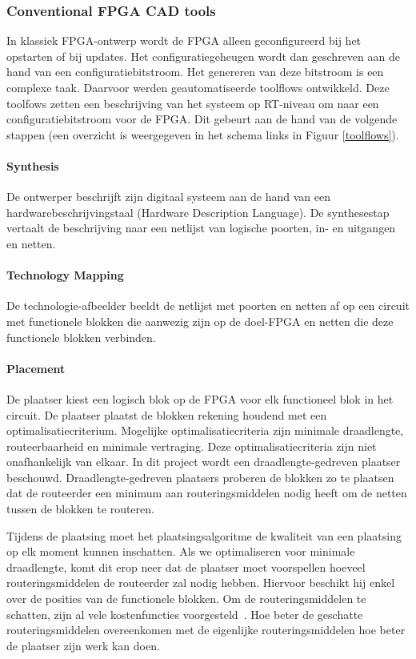 \documentclass[a4paper,oneside,12pt]{article}
\begin{document}
\subsubsection{Conventional FPGA CAD tools}
In klassiek FPGA-ontwerp wordt de FPGA alleen geconfigureerd bij het opstarten of bij updates. Het configuratiegeheugen wordt dan geschreven aan de hand van een configuratiebitstroom. Het genereren van deze bitstroom is een complexe taak. Daarvoor werden geautomatiseerde toolflows ontwikkeld. Deze toolfows zetten een beschrijving van het systeem op RT-niveau om naar een configuratiebitstroom voor de FPGA. Dit gebeurt aan de hand van de volgende stappen (een overzicht is weergegeven in het schema links in Figuur \ref{toolflows}).

\paragraph{Synthesis}
De ontwerper beschrijft zijn digitaal systeem aan de hand van een hardwarebeschrijvingstaal (Hardware Description Language). De synthesestap vertaalt de beschrijving naar een netlijst van logische poorten, in- en uitgangen en netten.

\paragraph{Technology Mapping} 
De technologie-afbeelder beeldt de netlijst met poorten en netten af op een circuit met functionele blokken die aanwezig zijn op de doel-FPGA en netten die deze functionele blokken verbinden.

\paragraph{Placement}
De plaatser kiest een logisch blok op de FPGA voor elk functioneel blok in het circuit. De plaatser plaatst de blokken rekening houdend met een optimalisatiecriterium. Mogelijke optimalisatiecriteria zijn minimale draadlengte, routeerbaarheid en minimale vertraging. Deze optimalisatiecriteria zijn niet onafhankelijk van elkaar. In dit project wordt een draadlengte-gedreven plaatser beschouwd. Draadlengte-gedreven plaatsers proberen de blokken zo te plaatsen dat de routeerder een minimum aan routeringsmiddelen nodig heeft om de netten tussen de blokken te routeren.

Tijdens de plaatsing moet het plaatsingsalgoritme de kwaliteit van een plaatsing op elk moment kunnen inschatten. Als we optimaliseren voor minimale draadlengte, komt dit erop neer dat de plaatser moet voorspellen hoeveel routeringsmiddelen de routeerder zal nodig hebben. Hiervoor beschikt hij enkel over de posities van de functionele blokken. Om de routeringsmiddelen te schatten, zijn al vele kostenfuncties voorgesteld~\cite{vprBVRJ, vprboek}. Hoe beter de geschatte routeringsmiddelen overeenkomen met de eigenlijke routeringsmiddelen hoe beter de plaatser zijn werk kan doen.
\end{document}
